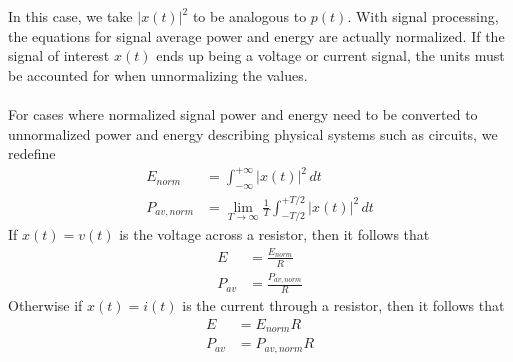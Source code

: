 \documentclass{report}
\begin{document}
In this case, we take $|x(t)|^2$ to be analogous to $p(t)$. With signal processing, 
the equations for signal average power and energy are actually normalized. If the signal of interest $x(t)$ 
ends up being a voltage or current signal, the units must be accounted for when unnormalizing the values.
\\ \\
For cases where normalized signal power and energy need to be converted to unnormalized power and energy describing physical systems such as circuits, we redefine 
\begin{align}
    E_{norm} &= \int_{-\infty}^{+\infty} |x(t)|^2 \,dt \\
    P_{av,norm} &= \lim_{T\rightarrow \infty} \frac{1}{T}\int_{-T/2}^{+T/2} |x(t)|^2 \,dt
\end{align}
If $x(t)=v(t)$ is the voltage across a resistor, then it follows that 
\begin{align}
    E &= \frac{E_{norm}}{R} \\ 
    P_{av} &= \frac{P_{av,norm}}{R}
\end{align}
Otherwise if $x(t)=i(t)$ is the current through a resistor, then it follows that 
\begin{align}
    E &= E_{norm}R \\
    P_{av} &= P_{av,norm}R
\end{align}
\end{document}
